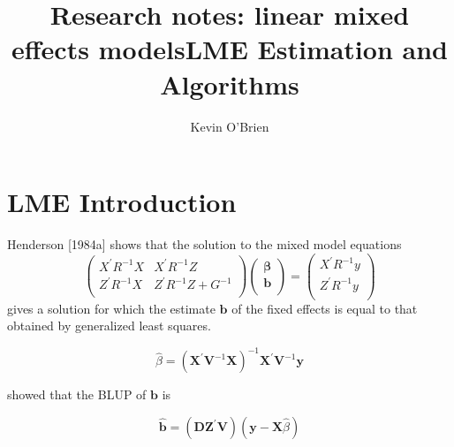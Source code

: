 \documentclass[12pt, a4paper]{article}
\title{Research notes: linear mixed effects models}
\author{ } \date{ }
\theoremstyle{plain}
\theoremstyle{definition}
\theoremstyle{remark}
\begin{document}
	\author{Kevin O'Brien}
	\title{LME Estimation and Algorithms}
	
	\tableofcontents \setcounter{tocdepth}{2}
	
	
\section{LME Introduction}



Henderson [1984a] shows that the solution to the mixed model equations
\begin{equation}
	\left(
	\begin{array}{cc}
		X^{\prime}R^{-1}X & X^{\prime}R^{-1}Z \\
		Z^{\prime}R^{-1}X & Z^{\prime}R^{-1}Z + G^{-1}\\
	\end{array}
	\right)\left(
	\begin{array}{c}
		\boldsymbol{\beta} \\
		\boldsymbol{b} \\
	\end{array}
	\right) = \left(
	\begin{array}{c}
		X^{\prime}R^{-1}y \\
		Z^{\prime}R^{-1}y \\
	\end{array}
	\right)
\end{equation}
gives a solution for which the estimate $\boldsymbol{b}$ of the fixed effects is equal to that obtained by generalized least squares.

\begin{equation}
	\hat{\beta} = (\boldsymbol{X^{\prime}}\boldsymbol{V}^{-1}\boldsymbol{X})^{-1}\boldsymbol{X^{\prime}}\boldsymbol{V}^{-1}\boldsymbol{y}
\end{equation}

\citet{Henderson63} showed that
the BLUP of $\boldsymbol{b}$ is

\begin{equation}
	\boldsymbol{\hat{b}} = (\boldsymbol{D}\boldsymbol{Z}^{\prime}\boldsymbol{V})(\boldsymbol{y} - \boldsymbol{X}\hat{\beta})
\end{equation}


\end{document}
